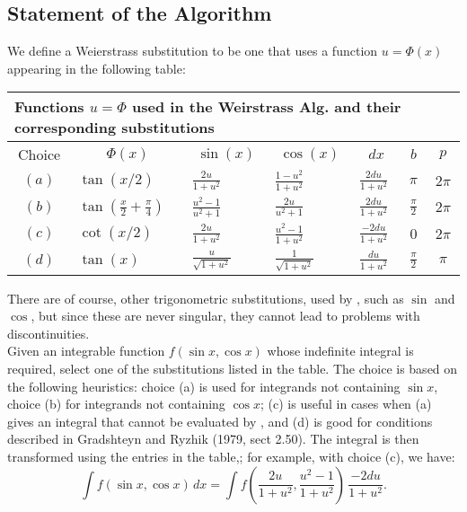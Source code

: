 \subsection{Statement of the Algorithm}
We define a Weierstrass substitution to be one that uses a function $u=\Phi(x)$ appearing in the following table: \\
%
\begin{tabular}{|c|p{1in}|p{0.5in}|p{0.5in}|p{0.5in}|c|c||} \hline
\multicolumn{7}{|l|}{Functions $u=\Phi$ used in the Weirstrass Alg. and their corresponding substitutions} \\ \hline
\multicolumn{1}{|c|}{Choice}
&\multicolumn{1}{|c|}{  $\Phi(x)$  }
&\multicolumn{1}{|c|}{  $\sin(x)$  }
&\multicolumn{1}{|c|}{  $\cos(x)$  }
&\multicolumn{1}{|c|}{  $dx$  }
&\multicolumn{1}{|c|}{  $b$  }
&\multicolumn{1}{|c|}{  $p$  }  \\  \hline
$(a)$  & $\tan(x/2)$ & $\frac{2u}{1+u^{2}}$ & $ \frac{1-u^{2}}{1+u^{2}}$ & $\frac{2du}{1+u^{2}}$ & $\pi$ & $2\pi$ \\ \hline
$(b)$  & $\tan(\frac{x}{2}+\frac{\pi}{4})$ & $\frac{u^{2}-1}{u^{2}+1}$ & $\frac{2u}{u^{2}+1} $ & $\frac{2du}{1+u^{2}}$ & $\frac{\pi}{2}$ & $2\pi$ \\ \hline
$(c)$ & $\cot(x/2)$ & $\frac{2u}{1+u^{2}}$ & $\frac{u^{2}-1}{1+u^{2}}$ & $\frac{-2du}{1+u^{2}}$ & $0$ & $2\pi$ \\ \hline
$(d)$ & $\tan(x)$ & $\frac{u}{\sqrt{1+u^{2}}}$ & $\frac{1}{\sqrt{1+u^{2}}}$ & $\frac{du}{1+u^{2}}$ & $\frac{\pi}{2}$ & $\pi$ \\ \hline
\end{tabular} \vspace{4mm}

There are of course, other trigonometric substitutions, used by \REDUCE, such as $\sin$ and $\cos$, but since these are never singular, they cannot lead to problems with discontinuities. \\
Given an integrable function $f(\sin x,\cos x)$ whose indefinite integral is required, select one of the substitutions listed in the table. The choice is based on the following heuristics: choice (a) is used for integrands not containing $\sin x$, choice (b) for integrands not containing $\cos x$; (c) is useful in cases when (a) gives an integral that cannot be evaluated by \REDUCE, and (d) is good for conditions described in Gradshteyn and Ryzhik (1979, sect 2.50). The integral is then transformed using the entries in the table,; for example, with choice (c), we have:
\[ \int f(\sin x,\cos x)\, dx = \int f(\frac{2u}{1+u^{2}},\frac{u^{2}-1}{1+u^{2}})\,\frac{-2 du}{1+u^{2}} . \]

